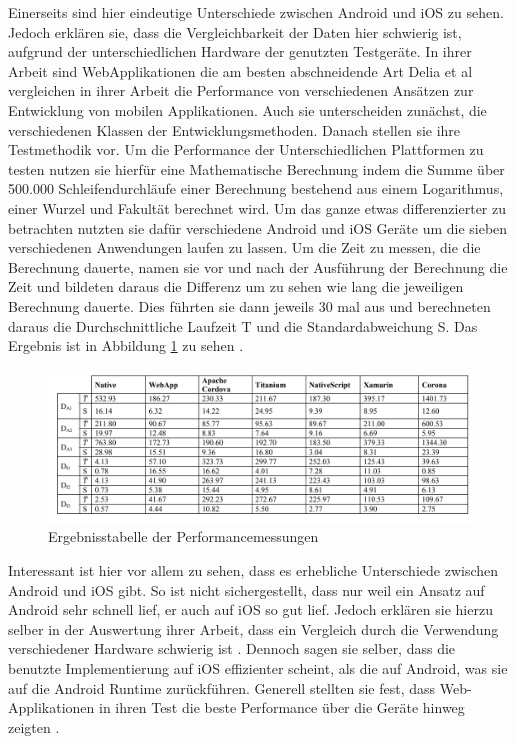 Einerseits sind hier eindeutige Unterschiede zwischen Android und iOS zu sehen. Jedoch erklären sie, dass die Vergleichbarkeit der Daten hier schwierig ist, aufgrund der unterschiedlichen Hardware der genutzten Testgeräte. In ihrer Arbeit sind WebApplikationen die am besten abschneidende Art
Delia et al vergleichen in ihrer Arbeit die Performance von verschiedenen Ansätzen zur Entwicklung von mobilen Applikationen. Auch sie unterscheiden zunächst, die verschiedenen Klassen der Entwicklungsmethoden. Danach stellen sie ihre Testmethodik vor. Um die Performance der Unterschiedlichen Plattformen zu testen nutzen sie hierfür eine Mathematische Berechnung indem die Summe über 500.000 Schleifendurchläufe einer Berechnung bestehend aus einem Logarithmus, einer Wurzel und Fakultät berechnet wird. Um das ganze etwas differenzierter zu betrachten nutzten sie dafür verschiedene Android und iOS Geräte um die sieben verschiedenen Anwendungen laufen zu lassen. Um die Zeit zu messen, die die Berechnung dauerte, namen sie vor und nach der Ausführung der Berechnung die Zeit und bildeten daraus die Differenz um zu sehen wie lang die jeweiligen Berechnung dauerte. Dies führten sie dann jeweils 30 mal aus und berechneten daraus die Durchschnittliche Laufzeit T und die Standardabweichung S. Das Ergebnis ist in Abbildung \ref{fig:result_table_IEEE_related_work} zu sehen \cite{IEEE_development_classes}.

\begin{figure}[ht]
  \centering
  \includegraphics[width=\textwidth,keepaspectratio]{images/IEEE_Delia_Al.png}
  \caption{Ergebnisstabelle der Performancemessungen \cite{IEEE_development_classes}}
  \label{fig:result_table_IEEE_related_work}
\end{figure}

Interessant ist hier vor allem zu sehen, dass es erhebliche Unterschiede zwischen Android und iOS gibt. So ist nicht sichergestellt, dass nur weil ein Ansatz auf Android sehr schnell lief, er auch auf iOS so gut lief. Jedoch erklären sie hierzu selber in der Auswertung ihrer Arbeit, dass ein Vergleich durch die Verwendung verschiedener Hardware schwierig ist \cite{IEEE_development_classes}. Dennoch sagen sie selber, dass die benutzte Implementierung auf iOS effizienter scheint, als die auf Android, was sie auf die Android Runtime zurückführen. Generell stellten sie fest, dass Web-Applikationen in ihren Test die beste Performance über die Geräte hinweg zeigten \cite{IEEE_development_classes}.

